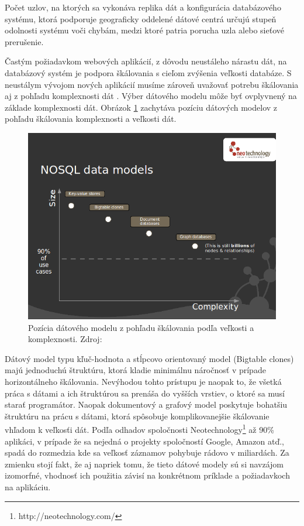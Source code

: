 \documentclass[11pt,twoside,a4paper]{book}
\begin{document}
Počet uzlov, na ktorých sa vykonáva replika dát a konfigurácia databázového systému, ktorá podporuje geograficky oddelené dátové centrá určujú stupeň odolnosti systému voči chybám, medzi ktoré patria porucha uzla alebo sieťové prerušenie.

Častým požiadavkom webových aplikácií, z dôvodu neustáleho nárastu dát, na databázový systém je podpora škálovania s cieľom zvýšenia veľkosti databáze. S neustálym vývojom nových aplikácií musíme zároveň uvažovať potrebu škálovania aj z pohľadu komplexnosti dát \cite{segaran2009beautiful}. Výber dátového modelu môže byť ovplyvnený na základe komplexnosti dát. Obrázok \ref{fig:scalling} zachytáva pozíciu dátových modelov z pohľadu škálovania komplexnosti a veľkosti dát.


\begin{figure}[h]
 \centering
 \includegraphics[width=13cm]{./figures/nosqldatamodels.png}
 \caption{Pozícia dátového modelu z pohľadu škálovania podľa veľkosti a komplexnosti. Zdroj: \cite{neo4j}}
 \label{fig:scalling}
\end{figure}

Dátový model typu kľuč-hodnota a stĺpcovo orientovaný model (Bigtable clones) majú jednoduchú štruktúru, ktorá kladie minimálnu náročnosť v prípade horizontálneho škálovania. Nevýhodou tohto prístupu je naopak to, že všetká práca s dátami a ich štruktúrou sa prenáša do vyšších vrstiev, o ktoré sa musí starať programátor. Naopak dokumentový a grafový model poskytuje bohatšiu štruktúru na prácu s dátami, ktorá spôsobuje komplikovanejšie škálovanie vhľadom k veľkosťi dát. Podľa odhadov spoločnosti Neotechnology\footnote{http://neotechnology.com/} až 90\% aplikáci, v prípade že sa nejedná o projekty spoločností Google, Amazon atď., spadá do rozmedzia kde sa veľkosť záznamov pohybuje rádovo v miliardách. Za zmienku stojí fakt, že aj napriek tomu, že tieto dátové modely sú si navzájom izomorfné, vhodnosť ich použitia závisí na konkrétnom príklade a požiadavkoch na aplikáciu. 
\end{document}
